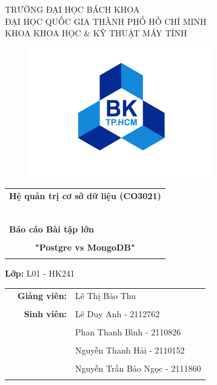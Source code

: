 \documentclass[11pt, a4paper]{article}
\begin{document}
\begin{titlepage}
\begin{center}
\large TRƯỜNG ĐẠI HỌC BÁCH KHOA\\
ĐẠI HỌC QUỐC GIA THÀNH PHỐ HỒ CHÍ MINH\\
KHOA KHOA HỌC \& KỸ THUẬT MÁY TÍNH
\end{center}

\vspace{-20pt}

\begin{figure}[h!]
\begin{center}
\includegraphics[width=8cm]{Image/Logo.png}
\end{center}
\end{figure}
\vspace{-20pt}
\begin{center}
\begin{tabular}{c}
\multicolumn{1}{c}{\textbf{{\Huge Hệ quản trị cơ sở dữ liệu (CO3021)}}}\\
~~\\
\hline
\\
\multicolumn{1}{l}{\textbf{{\large Báo cáo Bài tập lớn}}}\\
\\
\textbf{{\huge "Postgre vs MongoDB"}}\\
\\
\hline
\end{tabular}
\end{center}

\begin{center}
    \textbf{\large Lớp:} \large L01 - HK241 \\
\end{center}
\begin{table}[h]
\begin{tabular}{rrl}
\hspace{2 cm} & {\textbf{\large Giảng viên:}} & \large Lê Thị Bảo Thu\\\\
& {\textbf{\large Sinh viên:}} & \large Lê Duy Anh - 2112762\\\\
& & \large Phan Thanh Bình - 2110826\\\\
& & \large Nguyễn Thanh Hải - 2110152\\\\
& & \large Nguyễn Trần Bảo Ngọc - 2111860\\\\
\end{tabular}
\end{table}


\end{titlepage}
\end{document}
